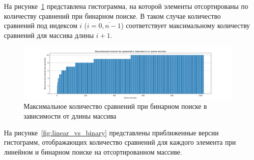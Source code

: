 На рисунке~\ref{fig:binary_hist_sorted} представлена гистограмма, на которой элементы отсортированы по количеству сравнений при бинарном поиске. В таком случае количество сравнений под индексом $i$ ($i=\overline{0, n-1}$) соответствует максимальному количеству сравнений для массива длины $i+1$.

\begin{figure}[H]
\centering
\includegraphics[width=\textwidth]{inc/img/binary_search_hist_sorted.png}
\caption{Максимальное количество сравнений при бинарном поиске в зависимости от длины массива}
\label{fig:binary_hist_sorted}
\end{figure}

На рисунке~\ref{fig:linear_vs_binary} представлены приближенные версии гистограмм, отображающих количество сравнений для каждого элемента при линейном и бинарном поиске на отсортированном массиве.

